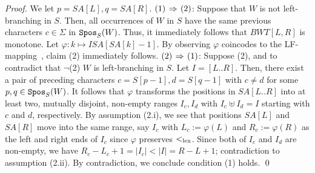 \begin{proof}
We let $p = SA[L], q = SA[R]$. 
$(1)\mathbin{\,\Rightarrow\,} (2)$: Suppose that $W$ is not left-branching in $S$.
Then, all occurrences of $W$ in $S$ have the same previous characters $c \in \Sigma$ in $\mathtt{Spos}_{S}(W)$. Thus, it immediately follows that $BWT[L, R]$ is monotone.
Let $\varphi: k \mapsto ISA[SA[k]-1]$. By observing $\varphi$ coincodes to the LF-mapping~\cite{Ferragina05:FM}, claim (2) immediately follows. 
$(2) \mathbin{\,\Rightarrow\,} (1)$: 
Suppose (2), and to contradict that $\neg$(2) $W$ is left-branching in $S$. Let $I = [L..R]$. Then, there exist a pair of preceding characters $c = S[p-1], d=S[q-1]$ with $c\not= d$ for some $p, q \in \mathtt{Spos}_{S}(W)$. It follows that $\varphi$ transforms the positions in  $SA[L..R]$ into at least two, mutually disjoint, non-empty ranges $I_c, I_d$ with $I_c\uplus I_d = I$ starting with $c$ and $d$, respectively. By assumption (2.i), we see that positions $SA[L]$ and $SA[R]$ move into the same range, say $I_c$ with $L_c := \varphi(L)$ and $R_c := \varphi(R)$ as the left and right ends of $I_c$ since $\varphi$ preserves $<_{\mathrm{lex}}$. 
Since both of $I_c$ and $I_d$ are non-empty, we have $R_c - L_c + 1 = |I_c| < |I| = R - L + 1$; contradiction to assumption (2.ii). By contradiction, we conclude condition (1) holds. 
\qed   
\end{proof}


